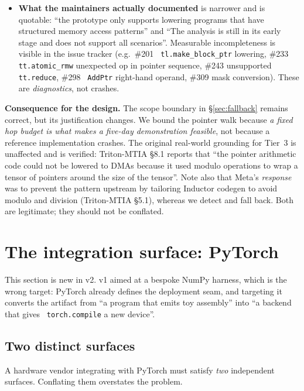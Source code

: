 \documentclass[11pt,a4paper]{article}
\newcommand{\code}[1]{\texttt{\small\hyphenchar\font=45 #1}}
\begin{document}
\begin{itemize}[leftmargin=1.3em,itemsep=0.4em]
      (1{,}375 lines) and  (1{,}959 lines).
\item \textbf{What the maintainers actually documented} is narrower and is quotable:
      ``the prototype only supports lowering programs that have structured memory access patterns'' and
      ``The analysis is still in its early stage and does not support all scenarios''. Measurable
      incompleteness is visible in the issue tracker (e.g.\ \#201 \code{tl.make\_block\_ptr} lowering,
      \#233 \code{tt.atomic\_rmw} unexpected op in pointer sequence, \#243 unsupported \code{tt.reduce},
      \#298 \code{AddPtr} right-hand operand, \#309 mask conversion). These are \emph{diagnostics}, not
      crashes.
\end{itemize}

\noindent\textbf{Consequence for the design.} The scope boundary in \S\ref{sec:fallback} remains correct, but
its justification changes. We bound the pointer walk because \emph{a fixed hop budget is what makes a
five-day demonstration feasible}, not because a reference implementation crashes. The original
real-world grounding for Tier~3 is unaffected and is verified: Triton-MTIA \S8.1 reports that ``the pointer
arithmetic code could not be lowered to DMAs because it used modulo operations to wrap a tensor of pointers
around the size of the tensor''. Note also that Meta's \emph{response} was to prevent the pattern upstream by
tailoring Inductor codegen to avoid modulo and division (Triton-MTIA \S5.1), whereas we detect and fall back.
Both are legitimate; they should not be conflated.

\section{The integration surface: PyTorch}\label{sec:surface}

This section is new in v2. v1 aimed at a bespoke NumPy harness, which is the wrong target: PyTorch already
defines the deployment seam, and targeting it converts the artifact from ``a program that emits toy
assembly'' into ``a backend that gives \code{torch.compile} a new device''.

\subsection{Two distinct surfaces}

A hardware vendor integrating with PyTorch must satisfy \emph{two} independent surfaces. Conflating them
overstates the problem.
\end{document}
